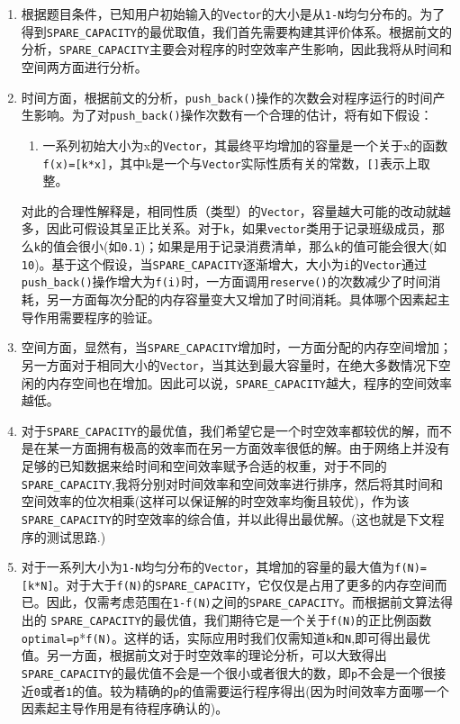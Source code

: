\documentclass[a4paper,12pt]{article}
\begin{document}
\begin{enumerate}
\begin{enumerate}
\begin{enumerate}
        \item 根据题目条件，已知用户{\hei 初始输入}的\verb|Vector|的大小是从\verb|1-N|均匀分布的。为了得到\verb|SPARE_CAPACITY|的最优取值，我们首先需要构建其评价体系。根据前文的分析，\verb|SPARE_CAPACITY|主要会对程序的时空效率产生影响，因此我将从时间和空间两方面进行分析。
        \item 时间方面，根据前文的分析，\verb|push_back()|操作的次数会对程序运行的时间产生影响。为了对\verb|push_back()|操作次数有一个合理的估计，将有如下假设：
        \begin{enumerate}
            \item {\hei 一系列初始大小为x的\verb|Vector|，其最终平均增加的容量是一个关于x的函数\verb|f(x)=[k*x]|，其中k是一个与\verb|Vector|实际性质有关的常数，\verb|[]|表示上取整。}
        \end{enumerate}
        对此的合理性解释是，相同性质（类型）的\verb|Vector|，容量越大可能的改动就越多，因此可假设其呈正比关系。对于\verb|k|，如果\verb|vector|类用于记录班级成员，那么\verb|k|的值会很小(如\verb|0.1|)；如果是用于记录消费清单，那么\verb|k|的值可能会很大(如\verb|10|)。基于这个假设，当\verb|SPARE_CAPACITY|逐渐增大，大小为\verb|i|的\verb|Vector|通过\verb|push_back()|操作增大为\verb|f(i)|时，一方面调用\verb|reserve()|的次数减少了时间消耗，另一方面每次分配的内存容量变大又增加了时间消耗。{\hei 具体哪个因素起主导作用需要程序的验证。}
        \item 空间方面，显然有，当\verb|SPARE_CAPACITY|增加时，一方面分配的内存空间增加；另一方面对于相同大小的\verb|Vector|，当其达到最大容量时，在绝大多数情况下空闲的内存空间也在增加。因此可以说，\verb|SPARE_CAPACITY|越大，程序的空间效率越低。
        \item 对于\verb|SPARE_CAPACITY|的最优值，我们希望它是一个时空效率都较优的解，而不是在某一方面拥有极高的效率而在另一方面效率很低的解。由于网络上并没有足够的已知数据来给时间和空间效率赋予合适的权重，对于不同的\verb|SPARE_CAPACITY|,我将分别对时间效率和空间效率进行排序，然后将其时间和空间效率的位次{\hei 相乘}(这样可以保证解的时空效率均衡且较优)，作为该\verb|SPARE_CAPACITY|的时空效率的综合值，并以此得出最优解。({\hei 这也就是下文程序的测试思路.})
        \item 对于一系列大小为\verb|1-N|均匀分布的\verb|Vector|，其增加的容量的最大值为\verb|f(N)=[k*N]|。对于大于\verb|f(N)|的\verb|SPARE_CAPACITY|，它仅仅是占用了更多的内存空间而已。因此，仅需考虑范围在\verb|1-f(N)|之间的\verb|SPARE_CAPACITY|。而根据前文算法得出的
        \verb|SPARE_CAPACITY|的最优值，我们期待它是一个关于\verb|f(N)|的正比例函数{\hei \verb|optimal=p|*\verb|f(N)|}。这样的话，实际应用时我们仅需知道\verb|k|和\verb|N|,即可得出最优值。另一方面，根据前文对于时空效率的理论分析，可以大致得出\verb|SPARE_CAPACITY|的最优值不会是一个很小或者很大的数，即\verb|p|不会是一个很接近\verb|0|或者\verb|1|的值。较为精确的\verb|p|的值需要运行程序得出(因为时间效率方面哪一个因素起主导作用是有待程序确认的)。

\end{enumerate}
\end{enumerate}
\end{enumerate}
\end{document}
